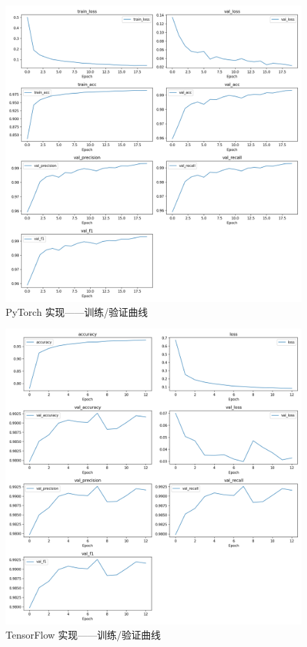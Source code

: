 \documentclass[UTF8]{article}
\begin{document}
\begin{figure}[H]
    \centering
    \includegraphics[width=.85\linewidth]{metricstorch.png}
    \caption{PyTorch 实现——训练/验证曲线}
    \label{fig:metricstorch}
\end{figure}

\begin{figure}[H]
    \centering
    \includegraphics[width=.85\linewidth]{metricstf.png}
    \caption{TensorFlow 实现——训练/验证曲线}
    \label{fig:metricstf}
\end{figure}
\end{document}
